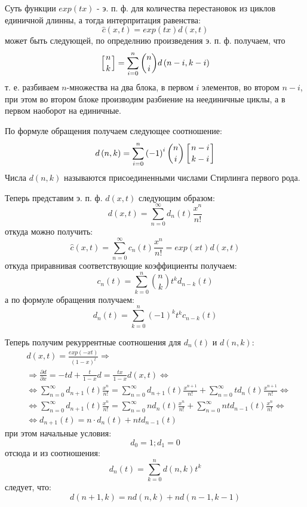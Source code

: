 Суть функции $exp\left(tx\right)$ - э. п. ф. для количества перестановок из циклов единичной длинны, а тогда интерпритация равенства:
\[
	\hat c\left(x,t\right) = exp\left(tx\right)d\left(x,t\right)
\]
может быть следующей, по определнию произведения э. п. ф. получаем, что
\[
	\left[{{n} \atop {k}}\right] = \sum_{i = 0}^n \binom{n}{i} d\left(n-i,k-i\right)
\]
т. е. разбиваем $n$-множества на два блока, в первом $i$ элементов, во втором $n-i$, при этом во втором блоке производим разбиение на неединичные циклы, а в первом наоборот на единичные.

По формуле обращения получаем следующее соотношение:
\[
	d\left(n,k\right) = \sum_{i=0}^n \left(-1\right)^i \binom{n}{i} \left[{{n-i}\atop{k-i}}\right]
\]
Числа $d\left(n,k\right)$ называются присоединенными числами Стирлинга первого рода.

Теперь представим э. п. ф. $d\left(x,t\right)$ следующим образом:
\[
	d\left(x,t\right) = \sum_{n=0}^{\infty} d_n\left(t\right)\frac{x^n}{n!}
\]
откуда можно получить:
\[
	\hat c\left(x,t\right) = \sum_{n=0}^{\infty} c_n\left(t\right)\frac{x^n}{n!} = exp\left(xt\right)d\left(x,t\right)
\]
откуда приравнивая соответствующие коэффициенты получаем:
\[
	c_n\left(t\right) = \sum_{k=0}^n \binom{n}{k} t^k d_{n-k}\left(t\right)
\]
а по формуле обращения получаем:
\[
	d_n\left(t\right) = \sum_{k=0}^n \left(-1\right)^kt^kc_{n-k}\left(t\right)
\]

Теперь получим рекуррентные соотношения для $d_n\left(t\right)$ и $d\left(n,k\right)$:
\[
	\begin{split}
		&d\left(x,t\right) = \frac{exp\left(-xt\right)}{\left(1-x\right)^t} \Rightarrow \\
		&\Rightarrow \frac{\partial d}{\partial x} = -td + \frac{t}{1-x}d = \frac{tx}{1-x}d\left(x,t\right) \Leftrightarrow \\
		&\Leftrightarrow \sum_{n=0}^{\infty}d_{n+1}\left(t\right) \frac{x^n}{n!} = \sum_{n=0}^{\infty}d_{n+1}\left(t\right)\frac{x^{n+1}}{n!} + \sum_{n=0}^{\infty} td_n\left(t\right) \frac{x^{n+1}}{n!} \Leftrightarrow\\
		&\Leftrightarrow \sum_{n=0}^{\infty}d_{n+1}\left(t\right)\frac{x^n}{n!} = \sum_{n=0}^{\infty}nd_n\left(t\right)\frac{x^n}{n!} + \sum_{n=0}^{\infty}ntd_{n-1}\left(t\right)\frac{x^n}{n!} \Leftrightarrow\\
		&\Leftrightarrow d_{n+1} \left(t\right) = n\cdot d_n\left(t\right) + nt d_{n-1}\left(t\right)
	\end{split}
\]
при этом начальные условия:
\[
	d_0 = 1; d_1 = 0
\]
отсюда и из соотношения:
\[
	d_n\left(t\right) = \sum_{k=0}^n d\left(n,k\right) t^k
\]
следует, что:
\[
	d\left(n+1,k\right) = nd\left(n,k\right) + nd\left(n-1,k-1\right)
\]

